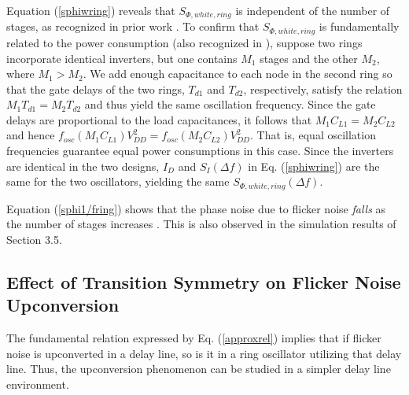 Equation (\ref{sphiwring}) reveals that $S_{\Phi, white, ring}$ is independent of the number of stages, as recognized in prior work \cite{Abidi,Hajimiri}. To confirm that $S_{\Phi,
white, ring}$ is fundamentally related to the power consumption (also recognized in \cite{Abidi,Hajimiri}),
suppose two rings incorporate identical inverters, but one contains
$M_1$ stages and the other $M_2$, where $M_1>M_2$. We add enough capacitance to each
node in the second ring so that the gate delays of the two rings, $T_{d1}$ and
$T_{d2}$, respectively, satisfy the relation $M_1 T_{d1}=M_2 T_{d2}$ and thus yield the same oscillation frequency. 
Since the gate delays are proportional to the load capacitances, it follows that $M_1 C_{L1}=M_2 C_{L2}$ and hence $f_{osc}(M_1 C_{L1})V_{DD}^2=f_{osc}(M_2
C_{L2})V_{DD}^2$. That is, equal oscillation frequencies guarantee equal power consumptions in this case.
Since the inverters are identical in the two designs, $I_D$ and $S_I(\Delta f)$ in Eq. (\ref{sphiwring}) are the same for the two oscillators, yielding the same
$S_{\Phi,white, ring}(\Delta f)$.

Equation (\ref{sphi1/fring}) shows that the phase noise due to flicker noise {\em falls} as the number of stages increases \cite{Abidi}. This is also
observed in the simulation results of Section 3.5.



\subsection{Effect of Transition Symmetry on Flicker Noise Upconversion}

The fundamental relation expressed by Eq. (\ref{approxrel}) implies that if flicker noise is upconverted in a delay line, so is it in a ring oscillator utilizing that delay line.
Thus, the upconversion phenomenon can be studied in a simpler delay line environment.


